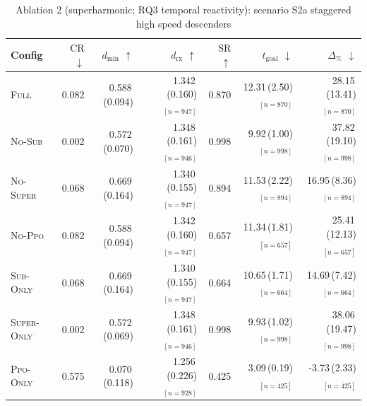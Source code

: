 \begin{table}[h]
\centering
\small
\caption{Ablation 2 (superharmonic; RQ3 temporal reactivity): scenario S2a staggered high speed descenders}
\label{tab:abl2:S2a_staggered_high_speed_descenders}
\begin{tabular}{lrrrrrr}
\toprule
Config & $\mathrm{CR}$ $\downarrow$ & $d_{\min}$ $\uparrow$ & $d_{\mathrm{rx}}$ $\uparrow$ & $\mathrm{SR}$ $\uparrow$ & $t_{\mathrm{goal}}$ $\downarrow$ & $\Delta_{\%}$ $\downarrow$ \\
\midrule
\textsc{Full} & 0.082 & 0.588\,(0.094) & 1.342\,(0.160)$_{[n=947]}$ & 0.870 & 12.31\,(2.50)$_{[n=870]}$ & 28.15\,(13.41)$_{[n=870]}$ \\
\textsc{No-Sub} & 0.002 & 0.572\,(0.070) & 1.348\,(0.161)$_{[n=946]}$ & 0.998 & 9.92\,(1.00)$_{[n=998]}$ & 37.82\,(19.10)$_{[n=998]}$ \\
\textsc{No-Super} & 0.068 & 0.669\,(0.164) & 1.340\,(0.155)$_{[n=947]}$ & 0.894 & 11.53\,(2.22)$_{[n=894]}$ & 16.95\,(8.36)$_{[n=894]}$ \\
\textsc{No-Ppo} & 0.082 & 0.588\,(0.094) & 1.342\,(0.160)$_{[n=947]}$ & 0.657 & 11.34\,(1.81)$_{[n=657]}$ & 25.41\,(12.13)$_{[n=657]}$ \\
\textsc{Sub-Only} & 0.068 & 0.669\,(0.164) & 1.340\,(0.155)$_{[n=947]}$ & 0.664 & 10.65\,(1.71)$_{[n=664]}$ & 14.69\,(7.42)$_{[n=664]}$ \\
\textsc{Super-Only} & 0.002 & 0.572\,(0.069) & 1.348\,(0.161)$_{[n=946]}$ & 0.998 & 9.93\,(1.02)$_{[n=998]}$ & 38.06\,(19.47)$_{[n=998]}$ \\
\textsc{Ppo-Only} & 0.575 & 0.070\,(0.118) & 1.256\,(0.226)$_{[n=928]}$ & 0.425 & 3.09\,(0.19)$_{[n=425]}$ & -3.73\,(2.33)$_{[n=425]}$ \\
\bottomrule
\end{tabular}
\end{table}


